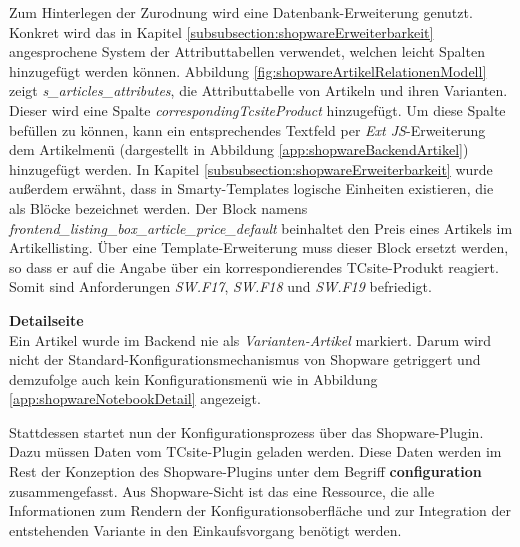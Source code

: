 \documentclass[12pt,a4paper,bibliography=totocnumbered,listof=totoc]{scrartcl}
\begin{document}
Zum Hinterlegen der Zurodnung wird eine Datenbank-Erweiterung genutzt. Konkret wird das in Kapitel \ref{subsubsection:shopwareErweiterbarkeit} angesprochene System der Attributtabellen verwendet, welchen leicht Spalten hinzugefügt werden können. Abbildung \ref{fig:shopwareArtikelRelationenModell} zeigt \emph{s\_articles\_attributes}, die Attributtabelle von Artikeln und ihren Varianten. Dieser wird eine Spalte \emph{correspondingTcsiteProduct} hinzugefügt. Um diese Spalte befüllen zu können, kann ein entsprechendes Textfeld per \emph{Ext JS}-Erweiterung dem Artikelmenü (dargestellt in Abbildung \ref{app:shopwareBackendArtikel}) hinzugefügt werden. In Kapitel \ref{subsubsection:shopwareErweiterbarkeit} wurde außerdem erwähnt, dass in Smarty-Templates logische Einheiten existieren, die als Blöcke bezeichnet werden. Der Block namens \emph{frontend\_listing\_box\_article\_price\_default} beinhaltet den Preis eines Artikels im Artikellisting.  Über eine Template-Erweiterung muss dieser Block ersetzt werden, so dass er auf die Angabe über ein korrespondierendes TCsite-Produkt reagiert. Somit sind Anforderungen \emph{SW.F17}, \emph{SW.F18} und \emph{SW.F19} befriedigt.

\textbf{Detailseite}\\
Ein Artikel wurde im Backend nie als \emph{Varianten-Artikel} markiert. Darum wird nicht der Standard-Konfigurationsmechanismus von Shopware getriggert und demzufolge auch kein Konfigurationsmenü wie in Abbildung \ref{app:shopwareNotebookDetail} angezeigt.

Stattdessen startet nun der Konfigurationsprozess über das Shopware-Plugin. Dazu müssen Daten vom TCsite-Plugin geladen werden. Diese Daten werden im Rest der Konzeption des Shopware-Plugins unter dem Begriff \textbf{configuration} zusammengefasst. Aus Shopware-Sicht ist das eine Ressource, die alle Informationen zum Rendern der Konfigurationsoberfläche und zur Integration der entstehenden Variante in den Einkaufsvorgang benötigt werden.
\end{document}
